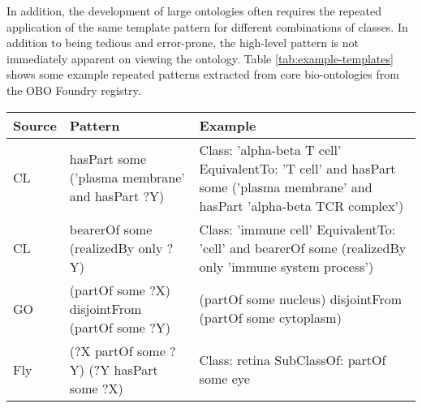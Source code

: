 \documentclass{llncs}
\begin{document}
In addition, the development of large ontologies often requires the
repeated application of the same template pattern for different
combinations of classes. In addition to being tedious and error-prone,
the high-level pattern is not immediately apparent on viewing the
ontology. Table \ref{tab:example-templates} shows some example
repeated patterns extracted from core bio-ontologies from the OBO
Foundry registry\cite{Smith2007}.

  \begin{table}
    \begin{tabular}{ | p{1.1cm} | p{4cm} | p{7cm} | }
      \hline 
      \textbf{Source} & \textbf{Pattern} & \textbf{Example} \\
      \hline

      CL &

      hasPart some ('plasma membrane' and hasPart ?Y)

      &

      Class: 'alpha-beta T cell' \newline
      EquivalentTo: 'T cell' and 
      hasPart some ('plasma membrane' and hasPart 'alpha-beta TCR complex')

      \\

      \hline

      CL &

      bearerOf some (realizedBy only ?Y)

      &

      Class: 'immune cell' \newline
      EquivalentTo: 'cell' and bearerOf some (realizedBy only 'immune system process')

      \\

      \hline

      GO &

      (partOf some ?X) disjointFrom (partOf some ?Y)

      &

      (partOf some nucleus) disjointFrom (partOf some cytoplasm)

      \\

      \hline

      Fly &

      (?X partOf some ?Y) \newline (?Y hasPart some ?X)

      &

      Class: retina \newline
      SubClassOf: partOf some eye \newline


\end{tabular}
\end{table}
\end{document}

